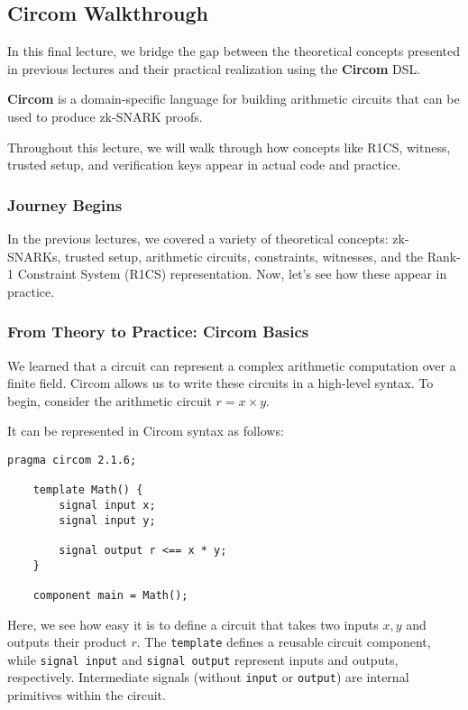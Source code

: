 \documentclass[../lecture-notes.tex]{subfiles}
\begin{document}
    \subsection{Circom Walkthrough}

    In this final lecture, we bridge the gap between the theoretical concepts presented in previous lectures and their practical realization using the \textbf{Circom} DSL.

    \begin{definition}
        \textbf{Circom} is a domain-specific language for building arithmetic circuits that can be used to produce zk-SNARK proofs.
    \end{definition}

    Throughout this lecture, we will walk through how concepts like R1CS, witness, trusted setup, and verification keys appear in actual code and practice.

    \subsubsection{Journey Begins}

    In the previous lectures, we covered a variety of theoretical concepts: zk-SNARKs, trusted setup, arithmetic circuits, constraints, witnesses, and the Rank-1 Constraint System (R1CS) representation.
    Now, let's see how these appear in practice.

    \subsubsection{From Theory to Practice: Circom Basics}

    We learned that a circuit can represent a complex arithmetic computation over a finite field.
    Circom allows us to write these circuits in a high-level syntax.
    To begin, consider the arithmetic circuit $r = x \times y$.

    It can be represented in Circom syntax as follows:

    \begin{lstlisting}[language=Circom]
    pragma circom 2.1.6;

    template Math() {
        signal input x;
        signal input y;

        signal output r <== x * y;
    }

    component main = Math();
    \end{lstlisting}

    Here, we see how easy it is to define a circuit that takes two inputs $x,y$ and outputs their product $r$.
    The \texttt{template} defines a reusable circuit component, while \texttt{signal input} and \texttt{signal output} represent inputs and outputs, respectively.
    Intermediate signals (without \texttt{input} or \texttt{output}) are internal primitives within the circuit.
\end{document}
